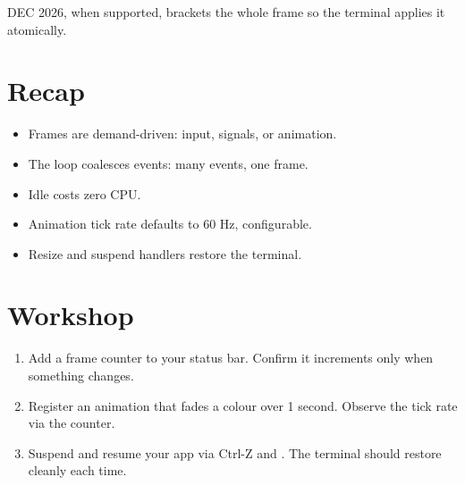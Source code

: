 DEC 2026, when supported, brackets the whole frame so the
terminal applies it atomically.

\section{Recap}

\begin{recap}
\begin{itemize}[leftmargin=*]
  \item Frames are demand-driven: input, signals, or
    animation.
  \item The loop coalesces events: many events, one frame.
  \item Idle costs zero CPU.
  \item Animation tick rate defaults to 60 Hz, configurable.
  \item Resize and suspend handlers restore the terminal.
\end{itemize}
\end{recap}

\section*{Workshop}

\begin{enumerate}[leftmargin=*]
  \item Add a frame counter to your status bar. Confirm it
    increments only when something changes.
  \item Register an animation that fades a colour over 1
    second. Observe the tick rate via the counter.
  \item Suspend and resume your app via Ctrl-Z and .
    The terminal should restore cleanly each time.
\end{enumerate}
